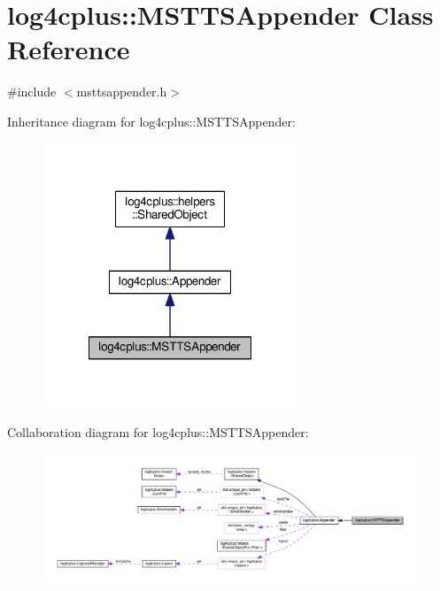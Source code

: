 \hypertarget{classlog4cplus_1_1MSTTSAppender}{\section{log4cplus\-:\-:M\-S\-T\-T\-S\-Appender Class Reference}
\label{classlog4cplus_1_1MSTTSAppender}
}


{\ttfamily \#include $<$msttsappender.\-h$>$}



Inheritance diagram for log4cplus\-:\-:M\-S\-T\-T\-S\-Appender\-:
\nopagebreak
\begin{figure}[H]
\begin{center}
\leavevmode
\includegraphics[width=216pt]{classlog4cplus_1_1MSTTSAppender__inherit__graph}
\end{center}
\end{figure}


Collaboration diagram for log4cplus\-:\-:M\-S\-T\-T\-S\-Appender\-:
\nopagebreak
\begin{figure}[H]
\begin{center}
\leavevmode
\includegraphics[width=350pt]{classlog4cplus_1_1MSTTSAppender__coll__graph}
\end{center}
\end{figure}
